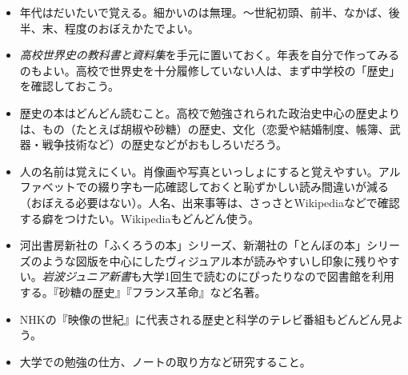 \documentclass[autodetect-engine,dvipdfmx-if-dvi,ja=standard]{bxjsarticle} \usepackage{mystyle}
\begin{document}
\begin{itemize}

\item 年代はだいたいで覚える。細かいのは無理。〜世紀初頭、前半、なかば、後半、末、程度のおぼえかたでよい。

\item \emph{高校世界史の教科書と資料集}を手元に置いておく。年表を自分で作ってみるのもよい。高校で世界史を十分履修していない人は、まず中学校の「歴史」を確認しておこう。
\item 歴史の本はどんどん読むこと。高校で勉強されられた政治史中心の歴史よりは、もの（たとえば胡椒や砂糖）の歴史、文化（恋愛や結婚制度、帳簿、武器・戦争技術など）の歴史などがおもしろいだろう。
\item 人の名前は覚えにくい。肖像画や写真といっしょにすると覚えやすい。アルファベットでの綴り字も一応確認しておくと恥ずかしい読み間違いが減る（おぼえる必要はない）。人名、出来事等は、さっさとWikipediaなどで確認する癖をつけたい。Wikipediaもどんどん使う。
\item 河出書房新社の「ふくろうの本」シリーズ、新潮社の「とんぼの本」シリーズのような図版を中心にしたヴィジュアル本が読みやすいし印象に残りやすい。\emph{岩波ジュニア新書}も大学1回生で読むのにぴったりなので図書館を利用する。『砂糖の歴史』『フランス革命』など名著。

\item NHKの『映像の世紀』に代表される歴史と科学のテレビ番組もどんどん見よう。

\item 大学での勉強の仕方、ノートの取り方など研究すること。

\end{itemize}
\end{document}
